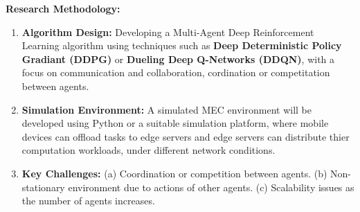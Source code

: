 \documentclass[12pt]{article}
\begin{document}
\noindent\textbf{\large Research Methodology: }
\begin{enumerate} 
\item \textbf{Algorithm Design:} Developing a Multi-Agent Deep Reinforcement Learning algorithm using techniques such as \textbf{Deep Deterministic Policy Gradiant (DDPG)} or \textbf{Dueling Deep Q-Networks (DDQN)}, with a focus on communication and collaboration, cordination or competitation between agents. \vspace{-1mm}
\item \textbf{Simulation Environment:} A simulated MEC environment will be developed using Python or a suitable simulation platform, where mobile devices can offload tasks to edge servers and edge servers can distribute thier computation workloads, under different network conditions.\vspace{-1mm}
\item \textbf{Key Challenges:} (a) Coordination or competition between agents. (b) Non-stationary environment due to actions of other agents.  (c) Scalability issues as the number of agents increases.
\end{enumerate}





\end{document}
